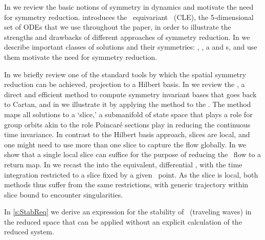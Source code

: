 In  we review the basic notions of symmetry
in dynamics and motivate the need for symmetry reduction.
 introduces the \ equivariant
\cLe\ (CLE), the 5-dimensional set of ODEs that we use
throughout the paper, in order to illustrate the strengths
and drawbacks of different approaches of symmetry reduction.
In  we describe important classes of
solutions and their symmetries: \eqva, \reqva, \po a and \rpo s,
and use them motivate the need for symmetry reduction.

In  we briefly review one of the standard tools
by which the spatial symmetry reduction can be achieved,
projection to a Hilbert basis.
In  we review the {\mframes}, a direct and
efficient method to compute symmetry invariant bases that
goes back to Cartan, and in  we
illustrate it by applying the method to the \cLe. The method
maps all solutions to a `slice,' a submanifold  of state
space that plays a role for group orbits akin to the role
Poincar\'e sections play in reducing the continuous time
invariance. In contrast to the Hilbert basis approach, slices
are local, and one might need to use more than one slice to
capture the flow globally. In  we show
that a single local slice can suffice for the purpose of reducing
the \cLe\ flow to a return map.
In  we recast the {\mframes}
into the equivalent, differential \mslices, with the
time integration
restricted to a slice fixed by a given \statesp\ point.
As the slice is local, both methods thus suffer from the same
restrictions, with generic trajectory within slice bound to encounter
singularities.

In \ref{s:StabReq} we derive an expression for the stability
of \reqva\ (traveling waves) in the reduced space
that can be applied without an explicit
calculation of the reduced system.
